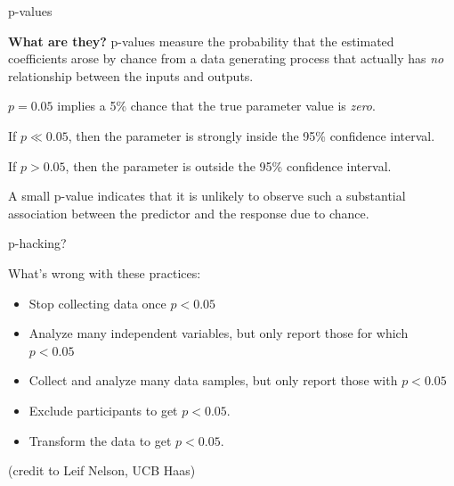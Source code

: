 \documentclass[aspectratio=169, handout]{beamer}
\begin{document}
\begin{frame}{p-values}

\textbf{What are they?}  \pause p-values measure the probability that the estimated coefficients arose by chance from a data generating process that actually has \textit{no} relationship between the inputs and outputs.  

\vspace{5mm}

$p = 0.05$ implies a 5\% chance that the true parameter value is \textit{zero}.  

\vspace{5mm}

If $p\ll0.05$, then the parameter is strongly inside the 95\% confidence interval.

\vspace{5mm}

If $p>0.05$, then the parameter is outside the 95\% confidence interval.

\vspace{5mm}

A small p-value indicates that it is unlikely to observe such a substantial association between the predictor and the response due to chance.

\end{frame}

\begin{frame}{p-hacking?}

What's wrong with these practices:
\begin{itemize}
  \item Stop collecting data once $p<0.05$
  \item Analyze many independent variables, but only report those for which $p<0.05$
  \item Collect and analyze many data samples, but only report those with $p<0.05$
  \item Exclude participants to get  $p<0.05$.
  \item Transform the data to get  $p<0.05$.
\end{itemize}

(credit to Leif Nelson, UCB Haas)

\end{frame}
\end{document}
